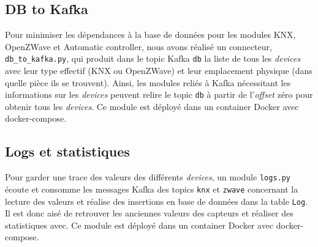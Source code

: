 \subsection{DB to Kafka}
Pour minimiser les dépendances à la base de données pour les modules KNX, OpenZWave et Automatic controller, nous avons réalisé un connecteur, \texttt{db_to_kafka.py}, qui produit dans le topic Kafka \texttt{db} la liste de tous les \textit{devices} avec leur type effectif (KNX ou OpenZWave) et leur emplacement physique (dans quelle pièce ils se trouvent). Ainsi, les modules reliés à Kafka nécessitant les informations sur les \textit{devices} peuvent relire le topic \texttt{db} à partir de l'\textit{offset} zéro pour obtenir tous les \textit{devices}. Ce module est déployé dans un container Docker avec docker-compose.

\subsection{Logs et statistiques}
Pour garder une trace des valeurs des différents \textit{devices}, un module \texttt{logs.py} écoute et consomme les messages Kafka des topics \texttt{knx} et \texttt{zwave} concernant la lecture des valeurs et réalise des insertions en base de données dans la table \texttt{Log}. Il est donc aisé de retrouver les anciennes valeurs des capteurs et réaliser des statistiques avec. Ce module est déployé dans un container Docker avec docker-compose.
